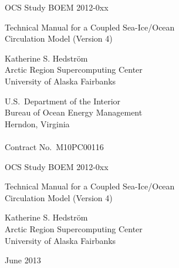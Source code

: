 %
%



\pagestyle{empty}
\centerline{\hfill OCS Study BOEM 2012-0xx}

\vspace {2 cm}
\begin{center}
  {\LARGE Technical Manual for a Coupled Sea-Ice/Ocean \\ Circulation
   Model (Version 4)  }
\end{center}
\vspace {2 cm}
\begin{center}
  Katherine S. Hedstr\"{o}m \\ Arctic Region Supercomputing Center
  \\ University of Alaska Fairbanks
\end{center}
\vspace {2 cm}
\begin{center}
  U.S.\ Department of the Interior \\ Bureau of Ocean Energy
  Management \\
  Herndon, Virginia \\ \mbox{} \\ Contract No.\ M10PC00116
\end{center}
\newpage
\centerline{\hfill OCS Study BOEM 2012-0xx}
\vspace {2 cm}
\begin{center}
  {\LARGE Technical Manual for a Coupled Sea-Ice/Ocean \\ Circulation
   Model (Version 4)  }
\end{center}
\vspace {2 cm}
\begin{center}
  Katherine S. Hedstr\"{o}m \\ Arctic Region Supercomputing Center
  \\ University of Alaska Fairbanks
\end{center}
\vspace {2 cm}
\centerline{June 2013}
\vfill

\makeatletter
  \renewcommand\appendix{%
    \renewcommand\section{%
        \newpage\thispagestyle{plain}%
       \suppressfloats[t]\@afterindentfalse%
       \secdef\Appendix\sAppendix}%
    \setcounter{section}{0}%
    \setcounter{subsection}{0}%
    \renewcommand\thesection{\Alph{section}}}
  \newcommand\Appendix[2][?]{%
     \refstepcounter{section}%
     \addcontentsline{toc}{section}%
       {\protect\numberline{\thesection}#1}%
     {\noindent\large\bfseries \appendixname\  \thesection\  #2\par}%
     \sectionmark{#1}%
     \@afterheading
     \addvspace{\baselineskip}}
   \newcommand\sAppendix[1]{%
     {\noindent\large\bfseries\appendixname~#1\par}%
     \@afterheading\addvspace{\baselineskip}}
 \makeatother

